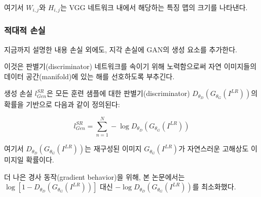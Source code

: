 \documentclass[10pt,twocolumn,letterpaper]{article}
\newcommand{\kor}[1]{#1}
\newcommand{\eng}[1]{}
\newcommand{\summary}[1]{}
\begin{document}
\summary{
VGG 손실을 사용하여 재구성-참조 이미지 간의 유클리드 거리를 이용하는 지각적 유사성에 더 가까운 손실 함수를 정의
}

\eng{
Here $W_{i,j}$ and $H_{i,j}$ describe the dimensions of the respective feature maps within the VGG network.
}\kor{
여기서 $W_{i,j}$와 $H_{i,j}$는 VGG 네트워크 내에서 해당하는 특징 맵의 크기를 나타낸다.
}

\summary{
특징 맵의 크기 표현 제시
}

\subsubsection{\eng{Adversarial loss}\kor{적대적 손실}}
\eng{
In addition to the content losses described so far, we also add the generative component of our \ac{GAN} to the perceptual loss.
}\kor{
지금까지 설명한 내용 손실 외에도, 지각 손실에 \ac{GAN}의 생성 요소를 추가한다.
} \eng{
This encourages our network to favor solutions that reside on the manifold of natural images, by trying to fool the discriminator network.
}\kor{
이것은 판별기(discriminator) 네트워크를 속이기 위해 노력함으로써 자연 이미지들의 데이터 공간(manifold)에 있는 해를 선호하도록 부추긴다.
} \eng{
The generative loss $l^{SR}_{Gen}$ is defined based on the probabilities of the discriminator $D_{\theta_D}(G_{\theta_G}(I^{LR}))$ over all training samples as:
}\kor{
생성 손실 $l^{SR}_{Gen}$은 모든 훈련 샘플에 대한 판별기(discriminator) $D_{\theta_D}(G_{\theta_G}(I^{LR}))$의 확률을 기반으로 다음과 같이 정의된다:
}
\begin{equation}
l^{SR}_{Gen} = \sum_{n=1}^{N} -\log D_{\theta_D}(G_{\theta_G}(I^{LR}))
\end{equation}

\summary{
GAN의 생성 요소를 추가하여 만든 지각 손실의 정의
}

\eng{
Here, $D_{\theta_D}(G_{\theta_G}(I^{LR}))$ is the probability that the reconstructed image $G_{\theta_G}(I^{LR})$ is a natural HR image.
}\kor{
여기서 $D_{\theta_D}(G_{\theta_G}(I^{LR}))$는 재구성된 이미지 $G_{\theta_G}(I^{LR})$가 자연스러운 고해상도 이미지일 확률이다.
} \eng{
For better gradient behavior we minimize $-\log D_{\theta_D}(G_{\theta_G}(I^{LR}))$ instead of $\log [1-D_{\theta_D}(G_{\theta_G}(I^{LR}))]$ \cite{Goodfellow14GAN}.
}\kor{
더 나은 경사 동작(gradient behavior)을 위해, 본 논문에서는 $\log [1-D_{\theta_D}(G_{\theta_G}(I^{LR}))]$ \cite{Goodfellow14GAN} 대신 $-\log D_{\theta_D}(G_{\theta_G}(I^{LR}))$를 최소화했다.
}

\summary{
지각 손실의 정의 설명
}
\end{document}
